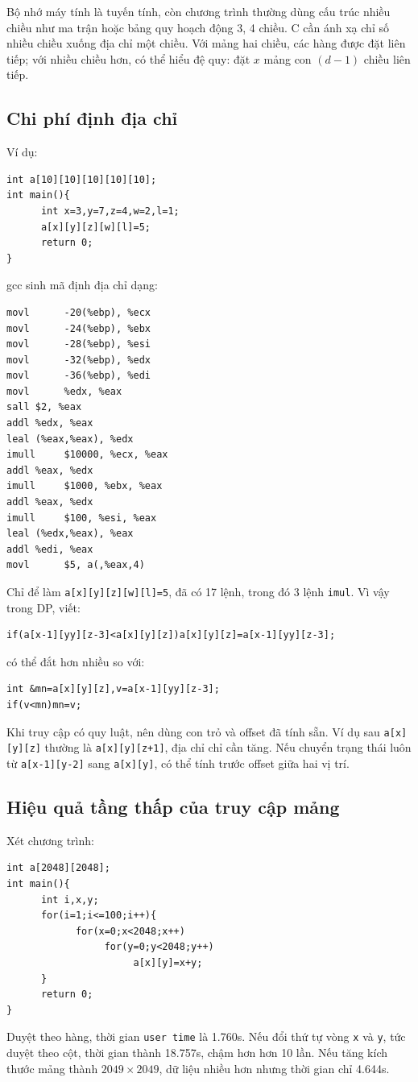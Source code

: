 \documentclass[11pt]{article}
\begin{document}
Bộ nhớ máy tính là tuyến tính, còn chương trình thường dùng cấu trúc nhiều
chiều như ma trận hoặc bảng quy hoạch động 3, 4 chiều. C cần ánh xạ chỉ số
nhiều chiều xuống địa chỉ một chiều. Với mảng hai chiều, các hàng được đặt
liên tiếp; với nhiều chiều hơn, có thể hiểu đệ quy: đặt \(x\) mảng con
\((d-1)\) chiều liên tiếp.

\subsection{Chi phí định địa chỉ}

Ví dụ:
\begin{verbatim}
int a[10][10][10][10][10];
int main(){
      int x=3,y=7,z=4,w=2,l=1;
      a[x][y][z][w][l]=5;
      return 0;
}
\end{verbatim}
gcc sinh mã định địa chỉ dạng:
\begin{verbatim}
movl      -20(%ebp), %ecx
movl      -24(%ebp), %ebx
movl      -28(%ebp), %esi
movl      -32(%ebp), %edx
movl      -36(%ebp), %edi
movl      %edx, %eax
sall $2, %eax
addl %edx, %eax
leal (%eax,%eax), %edx
imull     $10000, %ecx, %eax
addl %eax, %edx
imull     $1000, %ebx, %eax
addl %eax, %edx
imull     $100, %esi, %eax
leal (%edx,%eax), %eax
addl %edi, %eax
movl      $5, a(,%eax,4)
\end{verbatim}
Chỉ để làm \texttt{a[x][y][z][w][l]=5}, đã có 17 lệnh, trong đó 3 lệnh
\texttt{imul}. Vì vậy trong DP, viết:
\begin{verbatim}
if(a[x-1][yy][z-3]<a[x][y][z])a[x][y][z]=a[x-1][yy][z-3];
\end{verbatim}
có thể đắt hơn nhiều so với:
\begin{verbatim}
int &mn=a[x][y][z],v=a[x-1][yy][z-3];
if(v<mn)mn=v;
\end{verbatim}

Khi truy cập có quy luật, nên dùng con trỏ và offset đã tính sẵn. Ví dụ sau
\texttt{a[x][y][z]} thường là \texttt{a[x][y][z+1]}, địa chỉ chỉ cần tăng.
Nếu chuyển trạng thái luôn từ \texttt{a[x-1][y-2]} sang \texttt{a[x][y]},
có thể tính trước offset giữa hai vị trí.

\subsection{Hiệu quả tầng thấp của truy cập mảng}

Xét chương trình:
\begin{verbatim}
int a[2048][2048];
int main(){
      int i,x,y;
      for(i=1;i<=100;i++){
            for(x=0;x<2048;x++)
                 for(y=0;y<2048;y++)
                      a[x][y]=x+y;
      }
      return 0;
}
\end{verbatim}
Duyệt theo hàng, thời gian \texttt{user time} là 1.760s. Nếu đổi thứ tự vòng
\texttt{x} và \texttt{y}, tức duyệt theo cột, thời gian thành 18.757s, chậm
hơn hơn 10 lần. Nếu tăng kích thước mảng thành \(2049\times 2049\), dữ liệu
nhiều hơn nhưng thời gian chỉ 4.644s.
\end{document}
